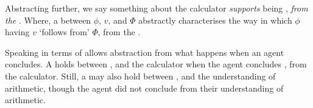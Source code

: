 \begin{note}
  Abstracting further, we say something about the calculator \emph{supports} \propM{\gistCalcEq{}} being , \emph{from the \agpe{}}.
  Where, a \ros{} between \(\phi\), \(v\), and \(\Phi\) abstractly characterises the way in which \(\phi\) having  \(v\) `follows from' \(\Phi\), from the \agpe{}.

  Speaking in terms of  allows abstraction from what happens when an agent concludes.
  A \ros{} holds between \propM{\gistCalcEq{}},  and the calculator when the agent concludes \propM{\gistCalcEq{}},  from the calculator.
  Still, a \ros{} may also hold between \propM{\gistCalcEq{}},  and the \agents{} understanding of arithmetic, though the agent did not conclude from their understanding of arithmetic.
\end{note}


